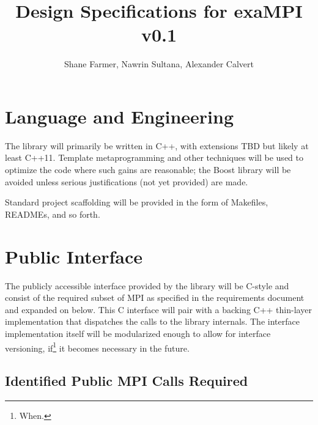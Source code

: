\documentclass{article}
\title{Design Specifications for exaMPI\\ v0.1}
\author{Shane Farmer, Nawrin Sultana, Alexander Calvert}
\begin{document}
\maketitle
\tableofcontents
 
\section{Language and Engineering}

The library will primarily be written in C++, with extensions TBD but likely at least C++11.  Template metaprogramming and other techniques will be used to optimize the code where such gains are reasonable; the Boost library will be avoided unless serious justifications (not yet provided) are made.

Standard project scaffolding will be provided in the form of Makefiles, READMEs, and so forth.

\section{Public Interface}

The publicly accessible interface provided by the library will be C-style and consist of the required subset of MPI as specified in the requirements document and expanded on below.  This C interface will pair with a backing C++ thin-layer implementation that dispatches the calls to the library internals.  The interface implementation itself will be modularized enough to allow for interface versioning, if\footnote{When.} it becomes necessary in the future.

\subsection{Identified Public MPI Calls Required}
\end{document}
